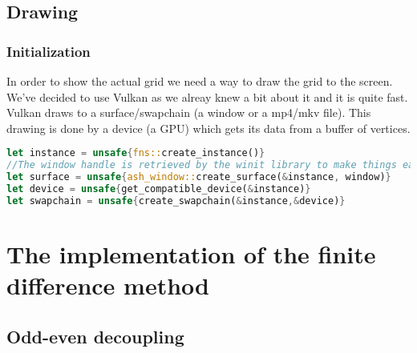 \documentclass{article}
\begin{document}
\subsection{Drawing}
\subsubsection{Initialization}
In order to show the actual grid we need a way to draw the grid to the screen. We've decided to use Vulkan as we alreay knew a bit about it and it is quite fast.\cite{Vulkan} Vulkan draws to a surface/swapchain (a window or a mp4/mkv file). This drawing is done by a device (a GPU) which gets its data from a buffer of vertices.
\begin{lstlisting}[language=Rust, style=boxed]
let instance = unsafe{fns::create_instance()}
//The window handle is retrieved by the winit library to make things easier
let surface = unsafe{ash_window::create_surface(&instance, window)}
let device = unsafe{get_compatible_device(&instance)}
let swapchain = unsafe{create_swapchain(&instance,&device)}
\end{lstlisting}





\section{The implementation of the finite difference method}
\subsection{Odd-even decoupling} \label{odd-even}
\end{document}
